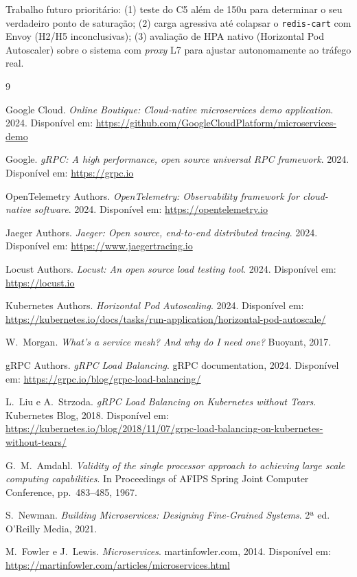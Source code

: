 \documentclass[manuscript,screen,review]{acmart}
\begin{document}
Trabalho futuro prioritário: (1) teste do C5 além de 150u para determinar o seu verdadeiro ponto de saturação; (2) carga agressiva até colapsar o \texttt{redis-cart} com Envoy (H2/H5 inconclusivas); (3) avaliação de HPA nativo (Horizontal Pod Autoscaler) sobre o sistema com \textit{proxy} L7 para ajustar autonomamente ao tráfego real.


\begin{thebibliography}{9}

Google Cloud. \textit{Online Boutique: Cloud-native microservices demo application}. 2024. Disponível em: \url{https://github.com/GoogleCloudPlatform/microservices-demo}

Google. \textit{gRPC: A high performance, open source universal RPC framework}. 2024. Disponível em: \url{https://grpc.io}

OpenTelemetry Authors. \textit{OpenTelemetry: Observability framework for cloud-native software}. 2024. Disponível em: \url{https://opentelemetry.io}

Jaeger Authors. \textit{Jaeger: Open source, end-to-end distributed tracing}. 2024. Disponível em: \url{https://www.jaegertracing.io}

Locust Authors. \textit{Locust: An open source load testing tool}. 2024. Disponível em: \url{https://locust.io}

Kubernetes Authors. \textit{Horizontal Pod Autoscaling}. 2024. Disponível em: \url{https://kubernetes.io/docs/tasks/run-application/horizontal-pod-autoscale/}

W.\ Morgan. \textit{What's a service mesh? And why do I need one?} Buoyant, 2017.

gRPC Authors. \textit{gRPC Load Balancing}. gRPC documentation, 2024. Disponível em: \url{https://grpc.io/blog/grpc-load-balancing/}

L.\ Liu e A.\ Strzoda. \textit{gRPC Load Balancing on Kubernetes without Tears}. Kubernetes Blog, 2018. Disponível em: \url{https://kubernetes.io/blog/2018/11/07/grpc-load-balancing-on-kubernetes-without-tears/}

G.\ M.\ Amdahl. \textit{Validity of the single processor approach to achieving large scale computing capabilities}. In Proceedings of AFIPS Spring Joint Computer Conference, pp.\ 483--485, 1967.

S.\ Newman. \textit{Building Microservices: Designing Fine-Grained Systems}. 2ª ed. O'Reilly Media, 2021.

M.\ Fowler e J.\ Lewis. \textit{Microservices}. martinfowler.com, 2014. Disponível em: \url{https://martinfowler.com/articles/microservices.html}

\end{thebibliography}
\end{document}
